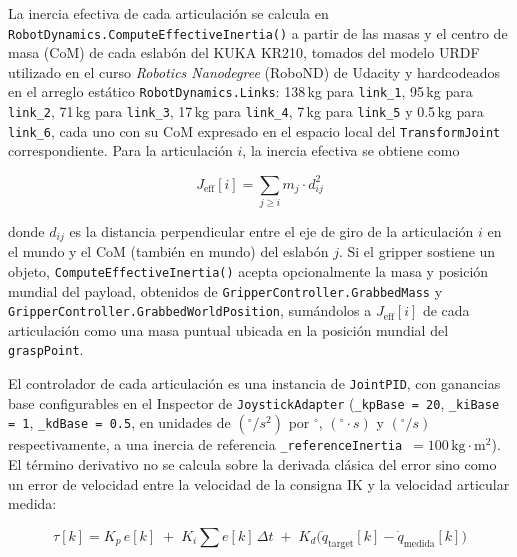 \documentclass[12pt]{article}
\begin{document}
La inercia efectiva de cada articulación se calcula en \texttt{RobotDynamics.\allowbreak ComputeEffectiveInertia()} a partir de las masas y el centro de masa (CoM) de cada eslabón del KUKA KR210, tomados del modelo URDF utilizado en el curso \textit{Robotics Nanodegree} (RoboND) de Udacity y hardcodeados en el arreglo estático \texttt{RobotDynamics.Links}: 138\,kg para \texttt{link\_1}, 95\,kg para \texttt{link\_2}, 71\,kg para \texttt{link\_3}, 17\,kg para \texttt{link\_4}, 7\,kg para \texttt{link\_5} y 0.5\,kg para \texttt{link\_6}, cada uno con su CoM expresado en el espacio local del \texttt{TransformJoint} correspondiente. Para la articulación $i$, la inercia efectiva se obtiene como

\begin{equation}
    J_{\text{eff}}[i] = \sum_{j \geq i} m_j \cdot d_{ij}^2
    \label{eq:jeff}
\end{equation}

donde $d_{ij}$ es la distancia perpendicular entre el eje de giro de la articulación $i$ en el mundo y el CoM (también en mundo) del eslabón $j$. Si el gripper sostiene un objeto, \texttt{ComputeEffectiveInertia()} acepta opcionalmente la masa y posición mundial del payload, obtenidos de \texttt{GripperController.\allowbreak GrabbedMass} y \texttt{GripperController.\allowbreak GrabbedWorldPosition}, sumándolos a $J_{\text{eff}}[i]$ de cada articulación como una masa puntual ubicada en la posición mundial del \texttt{graspPoint}.

El controlador de cada articulación es una instancia de \texttt{JointPID}, con ganancias base configurables en el Inspector de \texttt{JoystickAdapter} (\texttt{\_kpBase = 20}, \texttt{\_kiBase = 1}, \texttt{\_kdBase = 0.5}, en unidades de $({^\circ}/s^2)$ por ${^\circ}$, $({^\circ}{\cdot}s)$ y $({^\circ}/s)$ respectivamente, a una inercia de referencia \texttt{\_referenceInertia}~$= 100\,\mathrm{kg{\cdot}m^2}$). El término derivativo no se calcula sobre la derivada clásica del error sino como un error de velocidad entre la velocidad de la consigna IK y la velocidad articular medida:

\begin{equation}
    \tau[k] = K_p \, e[k] \;+\; K_i \sum e[k]\,\Delta t \;+\; K_d \bigl(\dot{q}_{\text{target}}[k] - \dot{q}_{\text{medida}}[k]\bigr)
    \label{eq:pid}
\end{equation}
\end{document}
